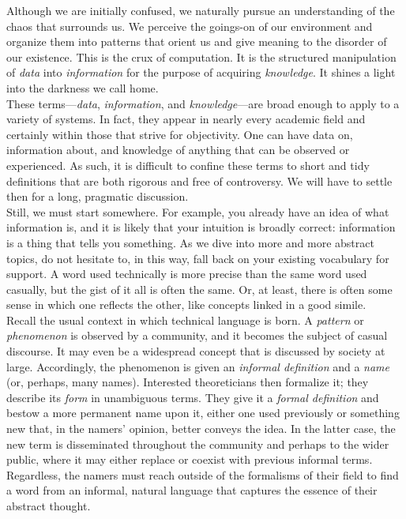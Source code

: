 Although we are initially confused, we naturally pursue an understanding of the chaos that surrounds us. We perceive the goings-on of our environment and organize them into patterns that orient us and give meaning to the disorder of our existence. This is the crux of computation. It is the structured manipulation of \textit{data} into \textit{information} for the purpose of acquiring \textit{knowledge}. It shines a light into the darkness we call home. \\

These terms---\textit{data}, \textit{information}, and \textit{knowledge}---are broad enough to apply to a variety of systems. In fact, they appear in nearly every academic field and certainly within those that strive for objectivity. One can have data on, information about, and knowledge of anything that can be observed or experienced. As such, it is difficult to confine these terms to short and tidy definitions that are both rigorous and free of controversy. We will have to settle then for a long, pragmatic discussion. \\

Still, we must start somewhere. For example, you already have an idea of what information is, and it is likely that your intuition is broadly correct: information is a thing that tells you something. As we dive into more and more abstract topics, do not hesitate to, in this way, fall back on your existing vocabulary for support. A word used technically is more precise than the same word used casually, but the gist of it all is often the same. Or, at least, there is often some sense in which one reflects the other, like concepts linked in a good simile. \\

Recall the usual context in which technical language is born. A \textit{pattern} or \textit{phenomenon} is observed by a community, and it becomes the subject of casual discourse. It may even be a widespread concept that is discussed by society at large. Accordingly, the phenomenon is given an \textit{informal definition} and a \textit{name} (or, perhaps, many names). Interested theoreticians then formalize it; they describe its \textit{form} in unambiguous terms. They give it a \textit{formal definition} and bestow a more permanent name upon it, either one used previously or something new that, in the namers' opinion, better conveys the idea. In the latter case, the new term is disseminated throughout the community and perhaps to the wider public, where it may either replace or coexist with previous informal terms. Regardless, the namers must reach outside of the formalisms of their field to find a word from an informal, natural language that captures the essence of their abstract thought. \\

